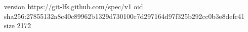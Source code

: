 version https://git-lfs.github.com/spec/v1
oid sha256:27855132a8c40c89962b1329d730100c7d297164d97f325b292cc0b3e8defc41
size 2172
